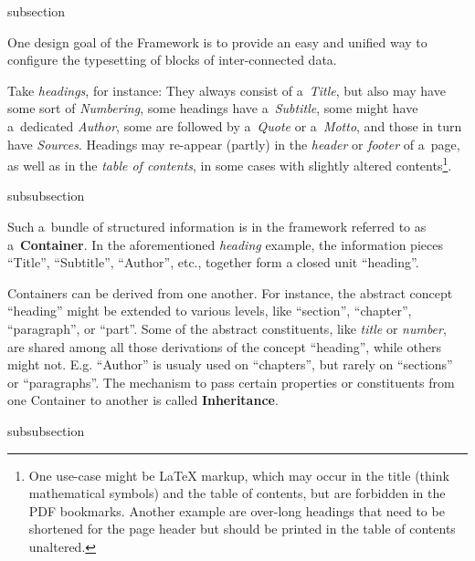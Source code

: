 \begin{heading}[label=sec:concepts]{subsection}
\end{heading}

One design goal of the {\CoCoTeX} Framework is to provide an easy and
unified way to configure the typesetting of blocks of inter-connected
data.

Take \textit{headings}, for instance: They always consist of
a~\textit{Title}, but also may have some sort of \textit{Numbering},
some headings have a~\textit{Subtitle}, some might have a~dedicated
\textit{Author}, some are followed by a~\textit{Quote} or
a~\textit{Motto}, and those in turn have \textit{Sources}. Headings
may re-appear (partly) in the \textit{header} or \textit{footer} of
a~page, as well as in the \textit{table of contents}, in some cases
with slightly altered contents\footnote{One use-case might be {\LaTeX}
  markup, which may occur in the title (think mathematical symbols)
  and the table of contents, but are forbidden in the PDF
  bookmarks. Another example are over-long headings that need to be
  shortened for the page header but should be printed in the table of
  contents unaltered.}.

\begin{heading}[label=sec:overview.containers]{subsubsection}
\end{heading}

Such a~bundle of structured information is in the {\CoCoTeX} framework
referred to as a~\textbf{Container}. In the aforementioned
\textit{heading} example, the information pieces “Title”, “Subtitle”,
“Author”, etc., together form a closed unit “heading”.

Containers can be derived from one another. For instance, the abstract
concept “heading” might be extended to various levels, like “section”,
“chapter”, “paragraph”, or “part”. Some of the abstract constituents,
like \textit{title} or \textit{number}, are shared among all those
derivations of the concept “heading”, while others might
not. E.g. “Author” is usualy used on “chapters”, but rarely on
“sections” or “paragraphs”. The mechanism to pass certain properties
or constituents from one Container to another is called
\textbf{Inheritance}.

\begin{heading}[label=sec:overview.components]{subsubsection}
\end{heading}

